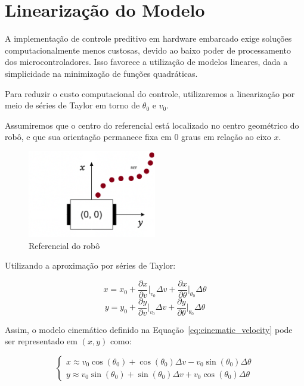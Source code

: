 \section{Linearização do Modelo}

A implementação de controle preditivo em hardware embarcado 
exige soluções computacionalmente menos custosas, 
devido ao baixo poder de processamento dos microcontroladores. 
Isso favorece a utilização de modelos lineares, dada a simplicidade 
na minimização de funções quadráticas.

\vspace{1em}
Para reduzir o custo computacional do controle, 
utilizaremos a linearização por meio de séries de Taylor 
em torno de $\theta_0$ e $v_0$.

\vspace{1em}
Assumiremos que o centro do referencial está localizado no 
centro geométrico do robô, e que sua orientação permanece 
fixa em 0 graus em relação ao eixo $x$.

\begin{figure}[h]
    \centering
    \includegraphics[width=0.5\textwidth]{figures/robot_reference.png}
    \caption{Referencial do robô}
    \label{fig:robot_reference}
\end{figure}

Utilizando a aproximação por séries de Taylor:

\[
x = x_0 + \frac{\partial x}{\partial v} \bigg|_{v_0} \Delta v + \frac{\partial x}{\partial \theta} \bigg|_{\theta_0} \Delta \theta
\]
\[
y = y_0 + \frac{\partial y}{\partial v} \bigg|_{v_0} \Delta v + \frac{\partial y}{\partial \theta} \bigg|_{\theta_0} \Delta \theta
\]

Assim, o modelo cinemático definido na Equação~\ref{eq:cinematic_velocity} 
pode ser representado em $(x, y)$ como:

\begin{equation}
\begin{cases}
x \approx v_0 \cos(\theta_0) + \cos(\theta_0) \Delta v - v_0 \sin(\theta_0) \Delta \theta \\
y \approx v_0 \sin(\theta_0) + \sin(\theta_0) \Delta v + v_0 \cos(\theta_0) \Delta \theta
\end{cases}
\end{equation}

